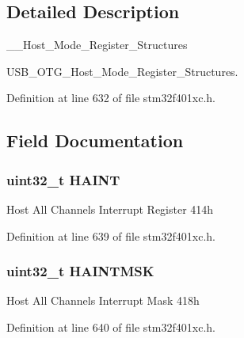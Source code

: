 \subsection{Detailed Description}
\+\_\+\+\_\+\+Host\+\_\+\+Mode\+\_\+\+Register\+\_\+\+Structures 

U\+S\+B\+\_\+\+O\+T\+G\+\_\+\+Host\+\_\+\+Mode\+\_\+\+Register\+\_\+\+Structures. 

Definition at line 632 of file stm32f401xc.\+h.



\subsection{Field Documentation}
\subsubsection[{\texorpdfstring{H\+A\+I\+NT}{HAINT}}]{ uint32\+\_\+t H\+A\+I\+NT}\hypertarget{struct_u_s_b___o_t_g___host_type_def_a9fb9e43255829e50b9e5416d58ae11be}{}\label{struct_u_s_b___o_t_g___host_type_def_a9fb9e43255829e50b9e5416d58ae11be}
Host All Channels Interrupt Register 414h 

Definition at line 639 of file stm32f401xc.\+h.

\subsubsection[{\texorpdfstring{H\+A\+I\+N\+T\+M\+SK}{HAINTMSK}}]{ uint32\+\_\+t H\+A\+I\+N\+T\+M\+SK}\hypertarget{struct_u_s_b___o_t_g___host_type_def_a4d431ac4a59cbb89ed82a6c6cf9dfc39}{}\label{struct_u_s_b___o_t_g___host_type_def_a4d431ac4a59cbb89ed82a6c6cf9dfc39}
Host All Channels Interrupt Mask 418h 

Definition at line 640 of file stm32f401xc.\+h.

